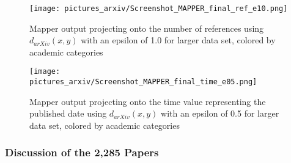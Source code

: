 \documentclass[12pt]{article}
\theoremstyle{definition}
\begin{document}
\begin{figure}[H]
\begin{center}
\texttt{[image: pictures\_arxiv/Screenshot\_MAPPER\_final\_ref\_e10.png]}
\end{center}
\caption{Mapper output projecting onto the number of references using $d_{arXiv}(x,y)$ with an epsilon of 1.0 for larger data set, colored by academic categories}
\label{pic-final-mapper-ref-e1.0}
\end{figure}
\begin{figure}[H]
\begin{center}
\texttt{[image: pictures\_arxiv/Screenshot\_MAPPER\_final\_time\_e05.png]}
\end{center}
\caption{Mapper output projecting onto the time value representing the published date using $d_{arXiv}(x,y)$ with an epsilon of 0.5 for larger data set, colored by academic categories}
\label{pic-final-mapper-time}
\end{figure}

\subsubsection{Discussion of the 2,285 Papers}
\end{document}
